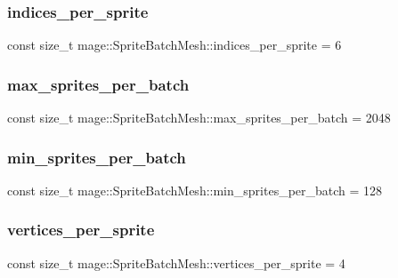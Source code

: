 \subsubsection{\texorpdfstring{indices\+\_\+per\+\_\+sprite}{indices\_per\_sprite}}
{\footnotesize\ttfamily const size\+\_\+t mage\+::\+Sprite\+Batch\+Mesh\+::indices\+\_\+per\+\_\+sprite = 6\hspace{0.3cm}{\ttfamily [static]}}

\hypertarget{classmage_1_1_sprite_batch_mesh_a562657a44b2b155e8d5496bfe8101ba2}{}\label{classmage_1_1_sprite_batch_mesh_a562657a44b2b155e8d5496bfe8101ba2} 
\subsubsection{\texorpdfstring{max\+\_\+sprites\+\_\+per\+\_\+batch}{max\_sprites\_per\_batch}}
{\footnotesize\ttfamily const size\+\_\+t mage\+::\+Sprite\+Batch\+Mesh\+::max\+\_\+sprites\+\_\+per\+\_\+batch = 2048\hspace{0.3cm}{\ttfamily [static]}}

\hypertarget{classmage_1_1_sprite_batch_mesh_abf82001c09270c14695bec433cf9810d}{}\label{classmage_1_1_sprite_batch_mesh_abf82001c09270c14695bec433cf9810d} 
\subsubsection{\texorpdfstring{min\+\_\+sprites\+\_\+per\+\_\+batch}{min\_sprites\_per\_batch}}
{\footnotesize\ttfamily const size\+\_\+t mage\+::\+Sprite\+Batch\+Mesh\+::min\+\_\+sprites\+\_\+per\+\_\+batch = 128\hspace{0.3cm}{\ttfamily [static]}}

\hypertarget{classmage_1_1_sprite_batch_mesh_a450088fe9797bc26008ede487b39f0d7}{}\label{classmage_1_1_sprite_batch_mesh_a450088fe9797bc26008ede487b39f0d7} 
\subsubsection{\texorpdfstring{vertices\+\_\+per\+\_\+sprite}{vertices\_per\_sprite}}
{\footnotesize\ttfamily const size\+\_\+t mage\+::\+Sprite\+Batch\+Mesh\+::vertices\+\_\+per\+\_\+sprite = 4\hspace{0.3cm}{\ttfamily [static]}}

